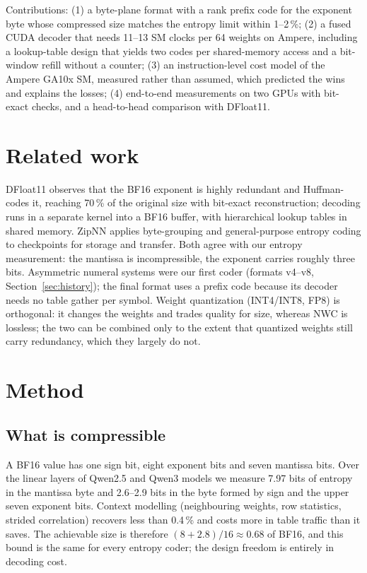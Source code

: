 \documentclass[11pt]{article}
\begin{document}
Contributions: (1) a byte-plane format with a rank prefix code for the exponent byte whose compressed size
matches the entropy limit within 1--2\,\%; (2) a fused CUDA decoder that needs 11--13 SM clocks per 64
weights on Ampere, including a lookup-table design that yields two codes per shared-memory access and a
bit-window refill without a counter; (3) an instruction-level cost model of the Ampere GA10x SM, measured
rather than assumed, which predicted the wins and explains the losses; (4) end-to-end measurements on two
GPUs with bit-exact checks, and a head-to-head comparison with DFloat11.

\section{Related work}

DFloat11 \cite{dfloat11} observes that the BF16 exponent is highly redundant and Huffman-codes it,
reaching 70\,\% of the original size with bit-exact reconstruction; decoding runs in a separate kernel into
a BF16 buffer, with hierarchical lookup tables in shared memory. ZipNN \cite{zipnn} applies byte-grouping
and general-purpose entropy coding to checkpoints for storage and transfer. Both agree with our entropy
measurement: the mantissa is incompressible, the exponent carries roughly three bits. Asymmetric numeral
systems \cite{ans} were our first coder (formats v4--v8, Section~\ref{sec:history}); the final format uses a
prefix code because its decoder needs no table gather per symbol. Weight quantization (INT4/INT8, FP8) is
orthogonal: it changes the weights and trades quality for size, whereas NWC is lossless; the two can be
combined only to the extent that quantized weights still carry redundancy, which they largely do not.

\section{Method}

\subsection{What is compressible}

A BF16 value has one sign bit, eight exponent bits and seven mantissa bits. Over the linear layers of
Qwen2.5 and Qwen3 models we measure 7.97 bits of entropy in the mantissa byte and 2.6--2.9 bits in the
byte formed by sign and the upper seven exponent bits. Context modelling (neighbouring weights, row
statistics, strided correlation) recovers less than 0.4\,\% and costs more in table traffic than it saves.
The achievable size is therefore $(8 + 2.8)/16 \approx 0.68$ of BF16, and this bound is the same for every
entropy coder; the design freedom is entirely in decoding cost.
\end{document}
